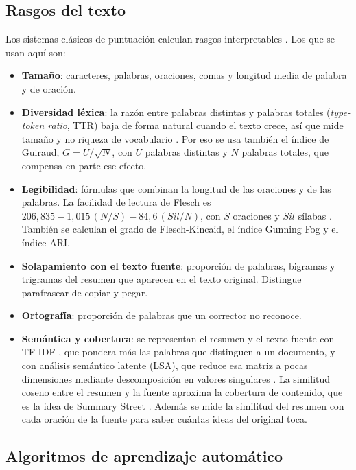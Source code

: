 \documentclass[11pt,a4paper]{article}
\begin{document}
\subsection{Rasgos del texto}

Los sistemas clásicos de puntuación calculan rasgos interpretables \citep{attali2006}. Los que se usan aquí son:
\begin{itemize}[nosep]
\item \textbf{Tamaño}: caracteres, palabras, oraciones, comas y longitud media de palabra y de oración.
\item \textbf{Diversidad léxica}: la razón entre palabras distintas y palabras totales (\emph{type-token ratio}, TTR) baja de forma natural cuando el texto crece, así que mide tamaño y no riqueza de vocabulario \citep{mccarthy2010}. Por eso se usa también el índice de Guiraud, $G = U/\sqrt{N}$, con $U$ palabras distintas y $N$ palabras totales, que compensa en parte ese efecto.
\item \textbf{Legibilidad}: fórmulas que combinan la longitud de las oraciones y de las palabras. La facilidad de lectura de Flesch es $206{,}835 - 1{,}015\,(N/S) - 84{,}6\,(Sil/N)$, con $S$ oraciones y $Sil$ sílabas \citep{flesch1948}. También se calculan el grado de Flesch-Kincaid, el índice Gunning Fog y el índice ARI.
\item \textbf{Solapamiento con el texto fuente}: proporción de palabras, bigramas y trigramas del resumen que aparecen en el texto original. Distingue parafrasear de copiar y pegar.
\item \textbf{Ortografía}: proporción de palabras que un corrector no reconoce.
\item \textbf{Semántica y cobertura}: se representan el resumen y el texto fuente con TF-IDF \citep{salton1988}, que pondera más las palabras que distinguen a un documento, y con análisis semántico latente (LSA), que reduce esa matriz a pocas dimensiones mediante descomposición en valores singulares \citep{landauer1998}. La similitud coseno entre el resumen y la fuente aproxima la cobertura de contenido, que es la idea de Summary Street \citep{kintsch2000}. Además se mide la similitud del resumen con cada oración de la fuente para saber cuántas ideas del original toca.
\end{itemize}

\subsection{Algoritmos de aprendizaje automático}
\end{document}
